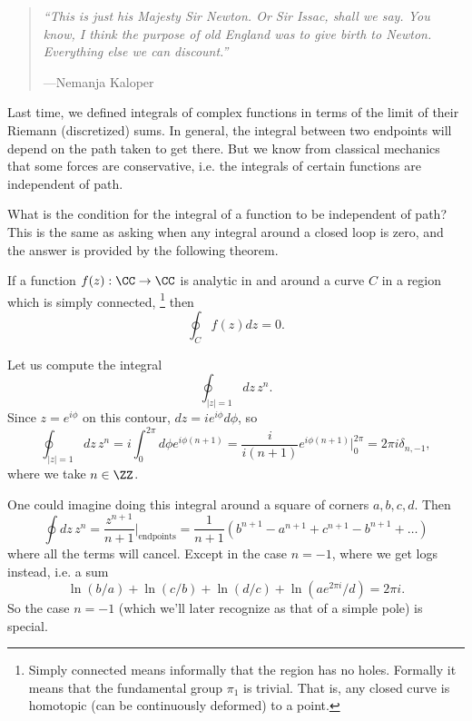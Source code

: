 \begin{quote}
    \textit{``This is just his Majesty Sir Newton. Or Sir Issac, shall we say. You know, I think the purpose of old England was to give birth to Newton. Everything else we can discount.''}
    
    ---Nemanja Kaloper
\end{quote}

Last time, we defined integrals of complex functions in terms of the limit of their Riemann (discretized) sums. In general, the integral between two endpoints will depend on the path taken to get there. But we know from classical mechanics that some forces are conservative, i.e. the integrals of certain functions are independent of path.

What is the condition for the integral of a function to be independent of path? This is the same as asking when any integral around a closed loop is zero, and the answer is provided by the following theorem.

\begin{thm}
    If a function $f(z):\CC\to \CC$ is analytic in and around a curve $C$ in a region which is simply connected,%
        \footnote{Simply connected means informally that the region has no holes. Formally it means that the fundamental group $\pi_1$ is trivial. That is, any closed curve is homotopic (can be continuously deformed) to a point.}
    then
    \begin{equation}
        \oint_C f(z) dz = 0.
    \end{equation}
\end{thm}

Let us compute the integral
\begin{equation}
    \oint_{|z|=1} dz \, z^n.
\end{equation}
Since $z= e^{i\phi}$ on this contour, $dz = i e^{i\phi}d\phi$, so
\begin{equation}
     \oint_{|z|=1} dz \, z^n = i \int_0^{2\pi} d\phi e^{i\phi(n+1)} = \frac{i}{i(n+1)} e^{i\phi(n+1)}|_0^{2\pi} = 2\pi i \delta_{n,-1},
\end{equation}
where we take $n\in \ZZ$.

One could imagine doing this integral around a square of corners $a,b,c,d$. Then
\begin{equation}
    \oint dz \, z^n = \frac{z^{n+1}}{n+1}|_\text{endpoints} = \frac{1}{n+1}(b^{n+1}-a^{n+1} + c^{n+1}-b^{n+1} + \dots)
\end{equation}
where all the terms will cancel. Except in the case $n=-1$, where we get logs instead, i.e. a sum
\begin{equation}
    \ln(b/a) + \ln(c/b) + \ln(d/c) + \ln (ae^{2\pi i}/d) = 2\pi i.
\end{equation}
So the case $n=-1$ (which we'll later recognize as that of a simple pole) is special.

